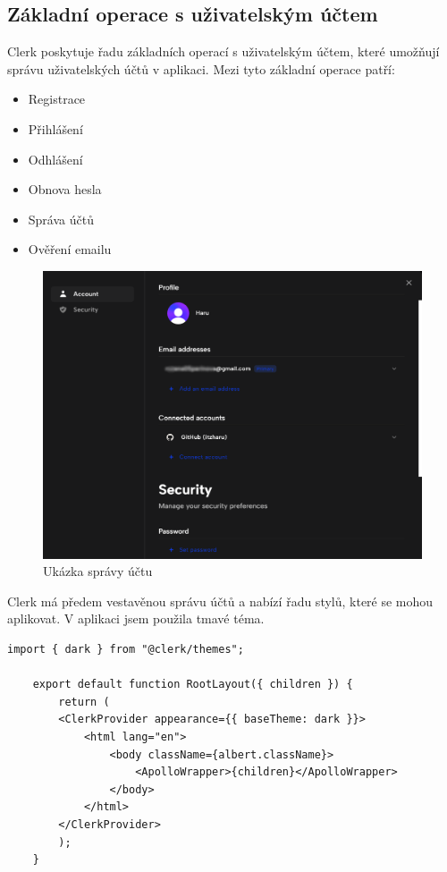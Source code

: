 \documentclass[12pt, a4paper,
oneside,      %
openright
]{report}
\begin{document}
\subsection{Základní operace s uživatelským účtem}
Clerk poskytuje řadu základních operací s uživatelským účtem, které umožňují správu uživatelských účtů v aplikaci. Mezi tyto základní operace patří: 

\begin{itemize}
	\item Registrace
	\item Přihlášení
	\item Odhlášení
	\item Obnova hesla
	\item Správa účtů
	\item Ověření emailu
\end{itemize}

\newpage
\begin{figure}[h]
	\centering
	\includegraphics[width=0.8\linewidth]{image/clerk-profile.png} 
	\caption{Ukázka správy účtu}
\end{figure}

Clerk má předem vestavěnou správu účtů a nabízí řadu stylů, které se mohou aplikovat. V aplikaci jsem použila tmavé téma.

\vspace{10pt}

\begin{lstlisting}[style=JavaScript, title={Kód}, caption={Ukázka Clerk dark theme v layout.js}] 
	import { dark } from "@clerk/themes";
	
	export default function RootLayout({ children }) {
		return (
		<ClerkProvider appearance={{ baseTheme: dark }}>
			<html lang="en">
				<body className={albert.className}>
					<ApolloWrapper>{children}</ApolloWrapper>
				</body>
			</html>
		</ClerkProvider>
		);
	}
\end{lstlisting}
\end{document}
